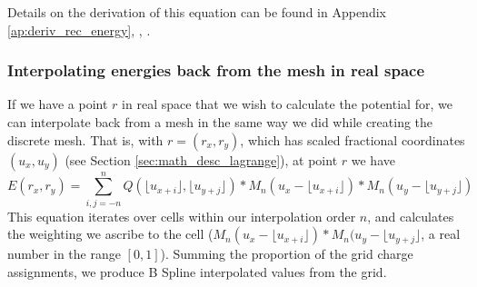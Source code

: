 \documentclass[pdftex,twoside,a4paper]{report}
\begin{document}
Details on the derivation of this equation can be found in Appendix \ref{ap:deriv_rec_energy}, \cite{essmann:8577}, \cite{lee05}.

\subsubsection{Interpolating energies back from the mesh in real space}
\label{sec:interpolate_from_grid}
If we have a point $r$ in real space that we wish to calculate the potential for, we can interpolate back from a mesh in the same way we did while creating the discrete mesh.
That is, with $r = (r_x,r_y)$, which has scaled fractional coordinates $(u_x,u_y)$ (see Section \ref{sec:math_desc_lagrange}), at point $r$ we have\\
\begin{equation}
\label{eq:interpoalte_from_grid}
E(r_x,r_y) = \sum _{i,j = -n} ^{n} Q(\lfloor u_{x+i} \rfloor,\lfloor u_{y+j} \rfloor) * M_n(u_x - \lfloor u_{x+i} \rfloor) * M_n(u_y - \lfloor u_{y+j} \rfloor)
\end{equation}
This equation iterates over cells within our interpolation order $n$, and calculates the weighting we ascribe to the cell ($ M_n(u_x - \lfloor u_{x+i} \rfloor) * M_n(u_y - \lfloor u_{y+j} \rfloor$, a real number in the range $[0,1]$). Summing the proportion of the grid charge assignments, we produce B Spline interpolated values from the grid.
\end{document}

